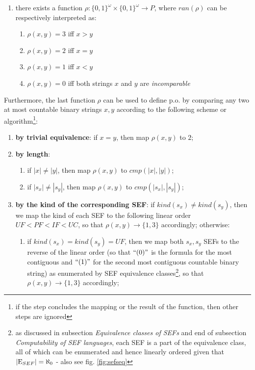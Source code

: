 \begin{definition}
\begin{enumerate}[label=(\roman*)]
\begin{enumerate}
    \end{enumerate}
    \item there exists a function $\rho: \{0,1\}^\omega \times \{0,1\}^\omega \to P$, where $ran(\rho)$ can be respectively interpreted as: 
    \begin{enumerate}
      \item $\rho(x, y) = 3$ iff $x > y$
      \item $\rho(x, y) = 2$ iff $x = y$
      \item $\rho(x, y) = 1$ iff $x < y$
      \item $\rho(x, y) = 0$ iff both strings $x$ and $y$ are \textit{incomparable}
    \end{enumerate}
  \end{enumerate}
  Furthermore, the last function $\rho$ can be used to define p.o. by comparing any two at most countable binary strings $x,y$ according to the following scheme or algorithm\footnote{if the step concludes the mapping or the result of the function, then other steps are ignored}:
  \begin{enumerate}
    \item \textbf{by trivial equivalence}: if $x = y$, then map $\rho(x,y)$ to $2$;
    \item \textbf{by length}: 
      \begin{enumerate}
        \item if $|x| \neq |y|$, then map $\rho(x,y)$ to $cmp(|x|,|y|)$;
        \item if $|s_x| \neq |s_y|$, then map $\rho(x,y)$ to $cmp(|s_x|,|s_y|)$;
      \end{enumerate}
    \item \textbf{by the kind of the corresponding SEF}: 
      if $kind(s_x) \neq kind(s_y)$, then we map the kind of each SEF to the following linear order $UF < PF < IF < UC$, so that $\rho(x,y) \to \{1, 3\}$ accordingly; otherwise:
      \begin{enumerate}
        \item if $kind(s_x) = kind(s_y) = UF$, then we map both $s_x, s_y$ SEFs to the reverse of the linear order (so that $\text{``} (0)\text{''}$ is the formula for the most contiguous and $\text{``} (1)\text{''}$ for the second most contiguous countable binary string) as enumerated by SEF equivalence classes\footnote{as discussed in subsection \textit{Equivalence classes of SEFs} and end of subsection \textit{Computability of SEF languages}, each SEF is a part of the equivalence class, all of which can be enumerated and hence linearly ordered given that $|\mathrm{E}_{SEF}| = \aleph_0$ - also see fig. \ref{fig:sefseq}}, so that $\rho(x,y) \to \{1, 3\}$ accordingly;

\end{enumerate}
\end{enumerate}
\end{definition}
